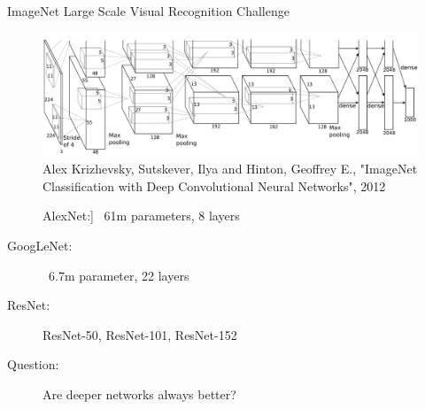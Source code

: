 \begin{frame}[allowframebreaks]{ImageNet Large Scale Visual Recognition Challenge}
	\begin{figure}
		\includegraphics[width=.6\textwidth, center]{figures/alexnet-arch}
		\caption*{{\tiny Alex Krizhevsky, Sutskever, Ilya and Hinton, Geoffrey E., "ImageNet Classification with Deep Convolutional Neural Networks", 2012 }}
	\end{figure}
	\begin{description}
		\item[]AlexNet:] ~61m parameters, 8 layers
		\item[GoogLeNet:] ~6.7m parameter, 22 layers
		\item[ResNet:] ResNet-50, ResNet-101, ResNet-152
		\item[Question:]Are deeper networks always better?
	\end{description}
	
\end{frame}





